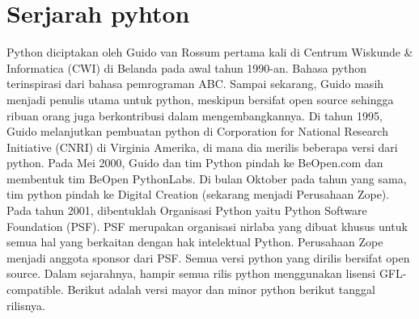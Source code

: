 \section{Serjarah pyhton}
Python diciptakan oleh Guido van Rossum pertama kali di  Centrum Wiskunde & Informatica (CWI) di Belanda pada awal tahun 1990-an. Bahasa python terinspirasi dari bahasa pemrograman ABC. Sampai sekarang, Guido masih menjadi penulis utama untuk python, meskipun bersifat open source sehingga ribuan orang juga berkontribusi dalam mengembangkannya.
Di tahun 1995, Guido melanjutkan pembuatan python di Corporation for National Research Initiative (CNRI) di Virginia Amerika, di mana dia merilis beberapa versi dari python.
Pada Mei 2000, Guido dan tim Python pindah ke BeOpen.com dan membentuk tim BeOpen PythonLabs. Di bulan Oktober pada tahun yang sama, tim python pindah ke Digital Creation (sekarang menjadi Perusahaan Zope). Pada tahun 2001, dibentuklah Organisasi Python yaitu Python Software Foundation (PSF). PSF merupakan organisasi nirlaba yang dibuat khusus untuk semua hal yang berkaitan dengan hak intelektual Python. Perusahaan Zope menjadi anggota sponsor dari PSF.
Semua versi python yang dirilis bersifat open source. Dalam sejarahnya, hampir semua rilis python menggunakan lisensi GFL-compatible. Berikut adalah versi mayor dan minor python berikut tanggal rilisnya.
